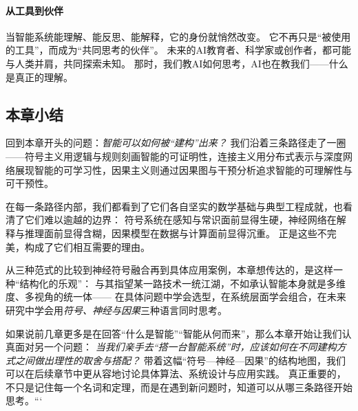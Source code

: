 \paragraph{从工具到伙伴}
当智能系统能理解、能反思、能解释，它的身份就悄然改变。  
它不再只是“被使用的工具”，而成为“共同思考的伙伴”。  
未来的AI教育者、科学家或创作者，都可能与人类并肩，共同探索未知。  
那时，我们教AI如何思考，AI也在教我们——什么是真正的理解。

\subsection{本章小结}

回到本章开头的问题：\emph{智能可以如何被“建构”出来？}  
我们沿着三条路径走了一圈——符号主义用逻辑与规则刻画智能的可证明性，连接主义用分布式表示与深度网络展现智能的可学习性，因果主义则通过因果图与干预分析追求智能的可理解性与可干预性。

在每一条路径内部，我们都看到了它们各自坚实的数学基础与典型工程成就，也看清了它们难以逾越的边界：  
符号系统在感知与常识面前显得生硬，神经网络在解释与推理面前显得含糊，因果模型在数据与计算面前显得沉重。  
正是这些不完美，构成了它们相互需要的理由。
 
从三种范式的比较到神经符号融合再到具体应用案例，本章想传达的，是这样一种“结构化的乐观”：  
与其指望某一路技术一统江湖，不如承认智能本身就是多维度、多视角的统一体——  
在具体问题中学会选型，在系统层面学会组合，在未来研究中学会用\emph{符号、神经与因果}三种语言同时思考。

如果说前几章更多是在回答“什么是智能”“智能从何而来”，那么本章开始让我们认真面对另一个问题：  
\emph{当我们亲手去“搭一台智能系统”时，应该如何在不同建构方式之间做出理性的取舍与搭配？}  
带着这幅“符号—神经—因果”的结构地图，我们可以在后续章节中更从容地讨论具体算法、系统设计与应用实践。  
真正重要的，不只是记住每一个名词和定理，而是在遇到新问题时，知道可以从哪三条路径开始思考。```
